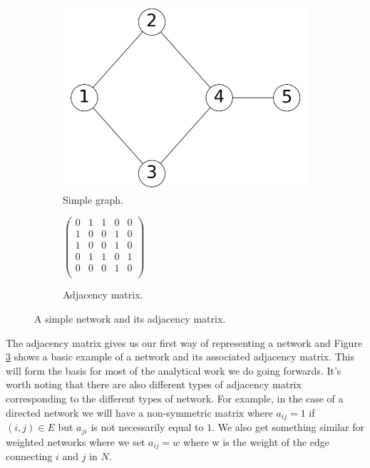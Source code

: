 \begin{figure}
    \begin{center}
        \begin{subfigure}[b]{0.45\textwidth}
            \includegraphics[width=\textwidth]{img/simple_example}
            \caption{Simple graph.}
            \label{fig:simple_network}
        \end{subfigure}
        \begin{subfigure}[b]{0.45\textwidth}
            \begin{center}
            $
            \begin{pmatrix}
                0 & 1 & 1 & 0 & 0 \\
                1 & 0 & 0 & 1 & 0 \\
                1 & 0 & 0 & 1 & 0 \\
                0 & 1 & 1 & 0 & 1 \\
                0 & 0 & 0 & 1 & 0 \\
            \end{pmatrix}
            $
            \end{center}
            \caption{Adjacency matrix.}
            \label{fig:simple_network_adjacency_matrix}
        \end{subfigure}
    \end{center}
    \caption{A simple network and its adjacency matrix.}
    \label{fig:simple_network_and_adjacency_matrix}
\end{figure}

The adjacency matrix gives us our first way of representing a network and Figure \ref{fig:simple_network_and_adjacency_matrix} shows a basic example of a network and its associated adjacency matrix. This will form the basis for most of the analytical work we do going forwards. It's worth noting that there are also different types of adjacency matrix corresponding to the different types of network. For example, in the case of a directed network we will have a non-symmetric matrix where $a_{ij} = 1$ if $(i, j) \in E$ but $a_{ji}$ is not necessarily equal to $1$. We also get something similar for weighted networks where we set $a_{ij} = w$ where w is the weight of the edge connecting $i$ and $j$ in $N$.

